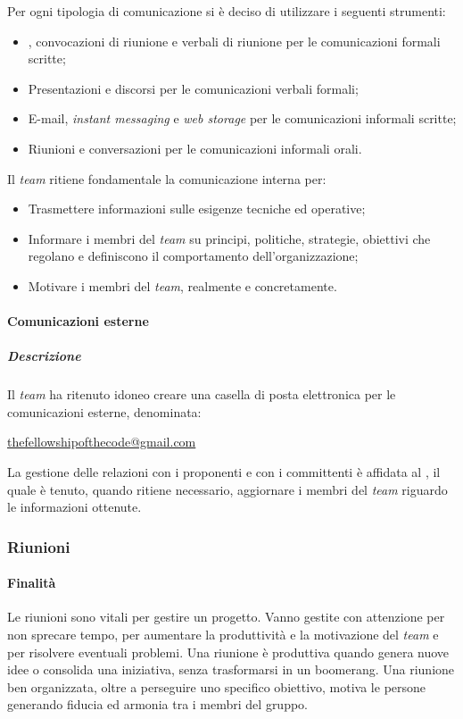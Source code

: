 Per ogni tipologia di comunicazione si è deciso di utilizzare i seguenti strumenti:
\begin{itemize}
\item
\textit{\PdP}, convocazioni di riunione e verbali di riunione per le comunicazioni formali scritte;
\item
Presentazioni e discorsi per le comunicazioni verbali formali;
\item
E-mail, \textit{instant messaging} e \textit{web storage} per le comunicazioni informali scritte;
\item
Riunioni e conversazioni per le comunicazioni informali orali.
\end{itemize}

Il \textit{team} ritiene fondamentale la comunicazione interna per:
\begin{itemize}
\item
Trasmettere informazioni sulle esigenze tecniche ed operative;
\item
Informare i membri del \textit{team} su principi, politiche, strategie, obiettivi che regolano e definiscono il comportamento dell'organizzazione;
\item
Motivare i membri del \textit{team}, realmente e concretamente.
\end{itemize}


\paragraph{Comunicazioni esterne}
\subparagraph{Descrizione}
Il \textit{team} ha ritenuto idoneo creare una casella di posta elettronica per le comunicazioni esterne, denominata:

\begin{center} \url{thefellowshipofthecode@gmail.com} \end{center}

La gestione delle relazioni con i proponenti e con i committenti è affidata al \textit{\RdP}, il quale è tenuto, quando ritiene necessario, aggiornare i membri del 	\textit{team} riguardo le informazioni ottenute.


\subsubsection{Riunioni}

\paragraph{Finalità}
Le riunioni sono vitali per gestire un progetto. Vanno gestite con attenzione per non sprecare tempo, per aumentare la produttività e la motivazione del \textit{team} e per risolvere eventuali problemi. Una riunione è produttiva quando genera nuove idee o consolida una iniziativa, senza trasformarsi in un boomerang.
Una riunione ben organizzata, oltre a perseguire uno specifico obiettivo, motiva le persone generando fiducia ed armonia tra i membri del gruppo.

